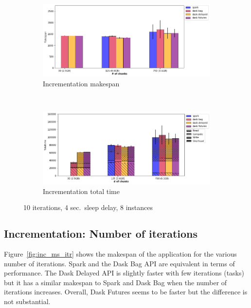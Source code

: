 \documentclass[conference]{IEEEtran}
\begin{document}
\begin{figure}[!t]
    \centering
    \begin{subfigure}[b]{\columnwidth}
        \includegraphics[clip,width=\columnwidth]{images/inc_block.png}%
        \caption{Incrementation makespan}\label{fig:inc_ms_block}
    \end{subfigure}
    \\
    \begin{subfigure}[b]{\columnwidth}
        \includegraphics[clip,width=\columnwidth]{images/inc_idle_block.png}%
        \caption{Incrementation total time}\label{fig:inc_tt_block}
    \end{subfigure}
    \caption{10 iterations, 4 sec.\ sleep delay, 8 instances}\label{fig:inc_block}
\end{figure}

\subsection{Incrementation: Number of iterations}
Figure~\ref{fig:inc_ms_itr} shows the makespan of the application for the various
number of iterations. Spark and the Dask Bag API are equivalent in terms of
performance. The Dask Delayed API is slightly faster with few iterations (tasks) but
it has a similar makespan to Spark and Dask Bag when the number of iterations
increases. Overall, Dask Futures seems to be faster but the difference is not
substantial.
\end{document}
